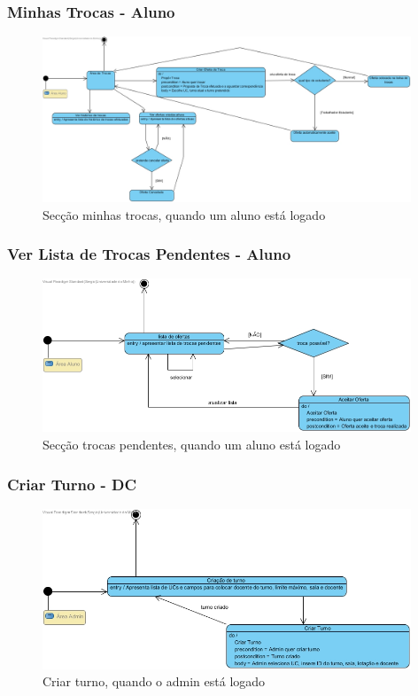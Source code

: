 \documentclass[a4paper]{article}
\begin{document}
\subsubsection{Minhas Trocas - Aluno}
\begin{figure}[H]
\centering
\includegraphics[width=11cm]{MEMinhasTrocas}
\caption{Secção minhas trocas, quando um aluno está logado}
\label{}
\end{figure}

\subsubsection{Ver Lista de Trocas Pendentes - Aluno}
\begin{figure}[H]
\centering
\includegraphics[width=11cm]{MEVerListadeTrocasPendentes}
\caption{Secção trocas pendentes, quando um aluno está logado}
\label{}
\end{figure}

\subsubsection{Criar Turno - DC}
\begin{figure}[H]
\centering
\includegraphics[width=11cm]{MECriarTurno}
\caption{Criar turno, quando o admin está logado}
\label{}
\end{figure}
\end{document}
